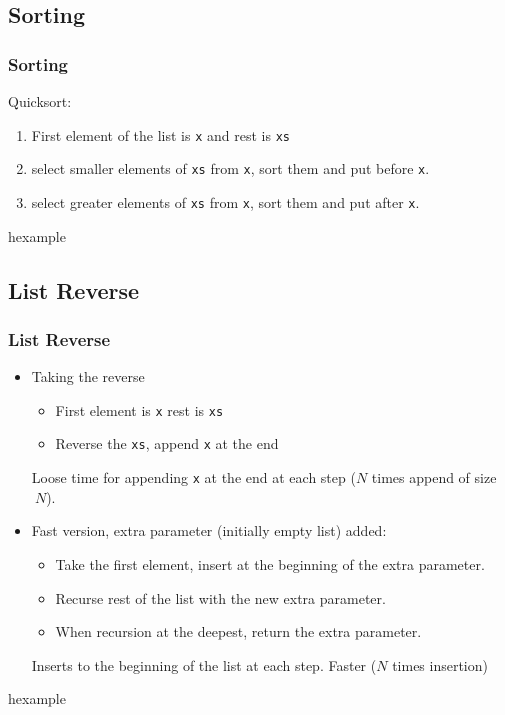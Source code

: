 \subsection{Sorting}
\begin{frame}
\frametitle{Sorting}
 Quicksort:
\begin{enumerate}
 \item First element of the list is \texttt{x} and rest is \texttt{xs}
 \item select smaller elements of \texttt{xs} from \texttt{x}, sort them and put before
 \texttt{x}.
 \item select greater elements of \texttt{xs} from \texttt{x}, sort them and put after
 \texttt{x}.
\end{enumerate}
\begin{beamercolorbox}{hexample}
\codesortH
\end{beamercolorbox}
\end{frame}


\subsection{List Reverse}
\begin{frame}
\frametitle{List Reverse}{\scriptsize
\begin{itemize}[<+->]
\item  Taking the reverse
\begin{itemize}\scriptsize
 \item First element is \texttt{x} rest is \texttt{xs}
 \item Reverse the \texttt{xs},  append \texttt{x} at the end
\end{itemize}
Loose time for appending \texttt{x} at the end at each step ($N$ times append of size $~ N$).
\item Fast version, extra parameter (initially empty list) added:
\begin{itemize}\scriptsize
 \item Take the first element, insert at the beginning of the extra parameter.
 \item Recurse rest of the list with the new extra parameter. 
 \item When recursion at the deepest, return the extra parameter.
\end{itemize}
Inserts to the beginning of the list at each step. Faster ($N$ times insertion)
\end{itemize}}
\begin{beamercolorbox}{hexample}
\codetersH
\end{beamercolorbox}
\end{frame}

